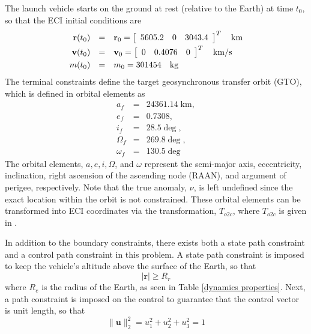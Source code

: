 \documentclass[10pt]{article}
\begin{document}
The launch vehicle starts on the ground at rest (relative to the Earth) at time $t_0$, so that the ECI initial conditions are
\begin{equation}\label{ICs}
\begin{array}{rcl}
\mathbf{r}(t_0) &=& \mathbf{r}_0 = \left[ \begin{array}{ccc} 5605.2 & 0 & 3043.4 \end{array} \right] ^T\quad \mbox{km} \vspace{3pt}\\
\mathbf{v}(t_0) &=& \mathbf{v}_0 = \left[ \begin{array}{ccc} 0 & 0.4076 & 0 \end{array} \right]^T \quad \mbox{km/s} \vspace{3pt}\\
m(t_0) &=& m_0 = 301454 \quad \mbox{kg}
\end{array}
\end{equation}
The terminal constraints define the target geosynchronous transfer
orbit (GTO), which is defined in orbital elements as
\begin{equation}\label{FCs}
\begin{array}{rcl}
 a_f &=   &  24361.14 \; \mbox{km}, \\
 e_f &=   &  0.7308, \\
 i_f &=   &  28.5\deg,\\
 \Omega_f &= & 269.8\deg, \\
 \omega_f &= & 130.5\deg
\end{array}
\end{equation}
The orbital elements, $a,e,i,\Omega$, and $\omega$ represent the semi-major
axis, eccentricity, inclination, right ascension of the ascending node
(RAAN), and argument of perigee, respectively.  Note that the true anomaly,
$\nu$, is left undefined since the exact location within the orbit is not
constrained.  These orbital elements can be transformed into ECI coordinates
via the transformation, $T_{o2c}$, where $T_{o2c}$ is given in \cite{Bate1}.

In addition to the boundary constraints, there exists both a state path
constraint and a control path constraint in this problem.  A state path
constraint is imposed to keep the vehicle's altitude above the surface of the
Earth, so that
\begin{equation}\label{xpath}
|\mathbf{r}|\geq R_r
\end{equation}
where $R_e$ is the radius of the Earth, as seen in Table \ref{dynamics properties}.  Next, a path constraint is imposed on the control to guarantee
that the control vector is unit length, so that
\begin{equation}\label{upath}
  \|\mathbf{u}\|_2^2 = u_1^2 + u_2^2 + u_3^2 = 1
\end{equation}
\end{document}
